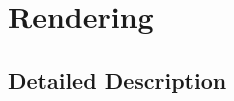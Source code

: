 \hypertarget{group____render}{\section{Rendering}
\label{group____render}
}


\subsection{Detailed Description}
